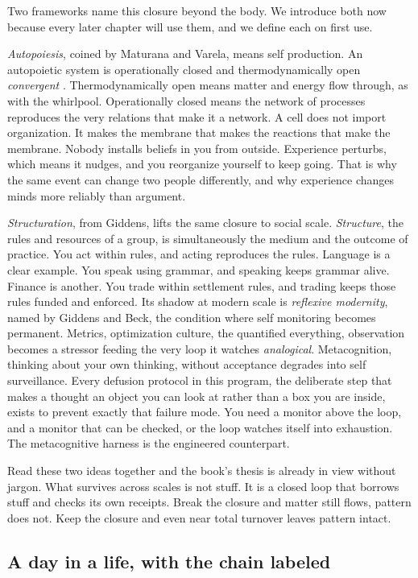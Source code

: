 Two frameworks name this closure beyond the body. We introduce both now because every later chapter will use them, and we define each on first use.

\textit{Autopoiesis}, coined by Maturana and Varela, means self production. An autopoietic system is operationally closed and thermodynamically open \textit{convergent} \citep{maturana1980}. Thermodynamically open means matter and energy flow through, as with the whirlpool. Operationally closed means the network of processes reproduces the very relations that make it a network. A cell does not import organization. It makes the membrane that makes the reactions that make the membrane. Nobody installs beliefs in you from outside. Experience perturbs, which means it nudges, and you reorganize yourself to keep going. That is why the same event can change two people differently, and why experience changes minds more reliably than argument.

\textit{Structuration}, from Giddens, lifts the same closure to social scale. \textit{Structure}, the rules and resources of a group, is simultaneously the medium and the outcome of practice. You act within rules, and acting reproduces the rules. Language is a clear example. You speak using grammar, and speaking keeps grammar alive. Finance is another. You trade within settlement rules, and trading keeps those rules funded and enforced. Its shadow at modern scale is \textit{reflexive modernity}, named by Giddens and Beck, the condition where self monitoring becomes permanent. Metrics, optimization culture, the quantified everything, observation becomes a stressor feeding the very loop it watches \textit{analogical}. Metacognition, thinking about your own thinking, without acceptance degrades into self surveillance. Every defusion protocol in this program, the deliberate step that makes a thought an object you can look at rather than a box you are inside, exists to prevent exactly that failure mode. You need a monitor above the loop, and a monitor that can be checked, or the loop watches itself into exhaustion. The metacognitive harness \citep{cao2026} is the engineered counterpart.

Read these two ideas together and the book's thesis is already in view without jargon. What survives across scales is not stuff. It is a closed loop that borrows stuff and checks its own receipts. Break the closure and matter still flows, pattern does not. Keep the closure and even near total turnover leaves pattern intact.

\subsection*{A day in a life, with the chain labeled}

